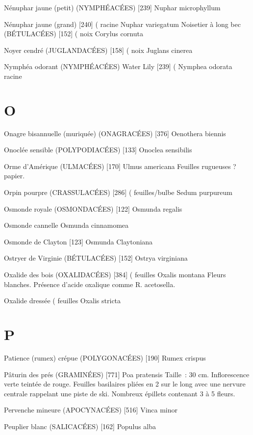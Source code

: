 \documentclass[book,12pt,a4paper,onecolumn,openany]{memoir}
\begin{document}
Nénuphar jaune (petit) (NYMPHÉACÉES)  [239]
				Nuphar microphyllum

Nénuphar jaune (grand)  [240]				( racine
				Nuphar variegatum
Noisetier à long bec (BÉTULACÉES)  [152]		( noix
				Corylus cornuta

Noyer cendré (JUGLANDACÉES)  [158]			( noix
				Juglans cinerea

Nymphéa odorant (NYMPHÉACÉES) Water Lily [239]		(
				Nymphea odorata				racine

\chapter*{O}

Onagre bisannuelle (muriquée) (ONAGRACÉES)  [376]
				Oenothera biennis

Onoclée sensible (POLYPODIACÉES)  [133]
				Onoclea sensibilis

Orme d’Amérique (ULMACÉES)  [170]
				Ulmus americana
Feuilles rugueuses ? papier.

Orpin pourpre (CRASSULACÉES)  [286]		( feuilles/bulbe
				Sedum purpureum

Osmonde royale (OSMONDACÉES) [122]
				Osmunda regalis

Osmonde cannelle
				Osmunda cinnamomea

Osmonde de Clayton  [123]
				Osmunda Claytoniana

Ostryer de Virginie (BÉTULACÉES) [152]
				Ostrya virginiana

Oxalide des bois (OXALIDACÉES)  [384]		( feuilles
				Oxalis montana
Fleurs blanches. Présence d’acide oxalique comme R. acetosella.

Oxalide dressée							( feuilles
				Oxalis stricta

\chapter*{P}

Patience (rumex) crépue (POLYGONACÉES)  [190]
				Rumex crispus

Pâturin des prés (GRAMINÉES)  [771]
				Poa pratensis
Taille : 30 cm. Inflorescence verte teintée de rouge.
Feuilles basilaires pliées en 2 sur le long avec une nervure centrale rappelant une piste de ski.
Nombreux épillets contenant 3 à 5 fleurs.

Pervenche mineure (APOCYNACÉES)  [516]
				Vinca minor

Peuplier blanc (SALICACÉES)  [162]
				Populus alba
\end{document}
